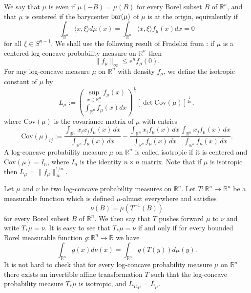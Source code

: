 \documentclass[11pt,leqno]{article}
\theoremstyle{definition}
\theoremstyle{remark}
\numberwithin{equation}{section}
\newcommand{\ls}{\leqslant}
\newcommand{\1}{\textbf{1}}
\begin{document}
We say that $\mu $ is even if $\mu (-B)=\mu (B)$ for every Borel subset $B$ of ${\mathbb R}^n$, and that $\mu $ is centered if the barycenter ${\rm bar}(\mu)$ of $\mu$
is at the origin, equivalently if
\begin{equation*}
\int_{\mathbb R^n} \langle x, \xi \rangle d\mu(x) = \int_{\mathbb R^n} \langle x, \xi \rangle f_{\mu}(x) dx = 0
\end{equation*} for all $\xi\in S^{n-1}$. We shall use the following result of Fradelizi from \cite{Fradelizi-1997}: if $\mu $ is a centered 
log-concave probability measure on ${\mathbb R}^n$ then
\begin{equation}\label{eq:frad-2}\|f_{\mu }\|_{\infty }\ls e^nf_{\mu }(0).\end{equation}
For any log-concave measure $\mu$ on ${\mathbb R}^n$ with density $f_{\mu}$, we define the isotropic constant of $\mu $ by
\begin{equation*}
L_{\mu }:=\left (\frac{\sup_{x\in {\mathbb R}^n} f_{\mu} (x)}{\int_{{\mathbb
R}^n}f_{\mu}(x)dx}\right )^{\frac{1}{n}} [\det \textrm{Cov}(\mu)]^{\frac{1}{2n}},\end{equation*}
where $\textrm{Cov}(\mu)$ is the covariance matrix of $\mu$ with entries
\begin{equation*}\textrm{Cov}(\mu )_{ij}:=\frac{\int_{{\mathbb R}^n}x_ix_j f_{\mu}
(x)\,dx}{\int_{{\mathbb R}^n} f_{\mu} (x)\,dx}-\frac{\int_{{\mathbb
R}^n}x_i f_{\mu} (x)\,dx}{\int_{{\mathbb R}^n} f_{\mu}
(x)\,dx}\frac{\int_{{\mathbb R}^n}x_j f_{\mu}
(x)\,dx}{\int_{{\mathbb R}^n} f_{\mu} (x)\,dx}.\end{equation*}
A log-concave probability measure $\mu $ on ${\mathbb R}^n$
is called isotropic if it is centered and $\textrm{Cov}(\mu )=I_n$,
where $I_n$ is the identity $n\times n$ matrix. Note that if $\mu$ is isotropic then $L_{\mu }=\|f_{\mu }\|_{\infty }^{1/n}$.

Let $\mu $ and $\nu$ be two log-concave probability measures on ${\mathbb R}^n$. Let $T:{\mathbb R}^n\to {\mathbb R}^n$ be a measurable function which is defined $\mu $-almost everywhere and satisfies
\begin{equation*}\nu (B)=\mu (T^{-1}(B))\end{equation*}
for every Borel subset $B$ of ${\mathbb R}^n$. We then say that $T$ pushes forward $\mu $ to $\nu $ and write $T_*\mu=\nu$. It is
easy to see that $T_*\mu =\nu $ if and only if for every bounded Borel
measurable function $g:{\mathbb R}^n\to {\mathbb R}$ we have
\begin{equation}\label{eq:push-forward}\int_{{\mathbb R}^n}g(x)d\nu (x)=\int_{{\mathbb R}^n}g(T(y))d\mu (y).\end{equation}
It is not hard to check that for every log-concave probability measure $\mu $ on $\mathbb{R}^n$ there exists
an invertible affine transformation $T$ such that the log-concave probability measure $T_{\ast }\mu $ is isotropic,
and $L_{T_{\ast}\mu}=L_{\mu}$.
\end{document}
